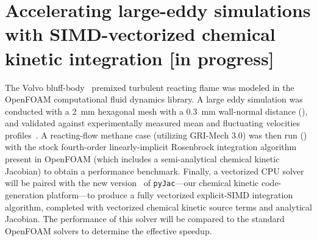\documentclass[a4paper,10pt]{article}
\begin{document}
\section{Accelerating large-eddy simulations with SIMD-vectorized chemical kinetic integration [in progress]}
The Volvo bluff-body~\cite{sjunnesson1991validation,sjunnesson1991lda} premixed turbulent reacting flame was modeled in the OpenFOAM computational fluid dynamics library.
A large eddy simulation was conducted with a \SI{2}{\milli\meter} hexagonal mesh with a \SI{0.3}{\milli\meter} wall-normal distance (), and validated against experimentally measured mean and fluctuating velocities profiles~\cite{sjunnesson1991validation,sjunnesson1991lda}.
A reacting-flow methane case (utilizing GRI-Mech 3.0) was then run () with the stock fourth-order linearly-implicit Rosenbrock integration algorithm present in OpenFOAM (which includes a semi-analytical chemical kinetic Jacobian) to obtain a performance benchmark.
Finally, a vectorized CPU solver~\cite{STONE201818} will be paired with the new version~ of \texttt{pyJac}---our chemical kinetic code-generation platform---to produce a fully vectorized explicit-SIMD integration algorithm, completed with vectorized chemical kinetic source terms and analytical Jacobian.
The performance of this solver will be compared to the standard OpenFOAM solvers to determine the effective speedup.
\end{document}
